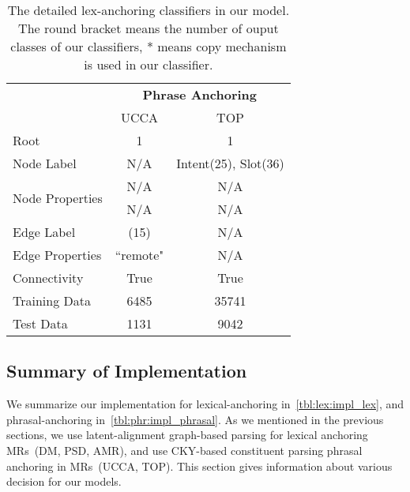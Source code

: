 \begin{table}[!ht]
\begin{center}
\small
\begin{tabular}{l|cc}
\toprule
\hline
                                 & \multicolumn{2}{c}{{\bf Phrase Anchoring}} \\ \cline{2-3}
                                 & UCCA      & TOP                            \\ \hline
Root                             & 1         & 1                              \\ \hline
Node Label                       & N/A       & Intent(25), Slot(36)           \\ \hline
\multirow{2}{*}{Node Properties} & N/A       & N/A                            \\
                                 & N/A       & N/A                            \\ \hline
Edge Label                       & (15)      & N/A                            \\ \hline
Edge Properties                  & ``remote" & N/A                            \\ \hline
Connectivity                     & True      & True                           \\ \hline
Training Data                    & 6485      & 35741                          \\ \hline
Test Data                        & 1131      & 9042                           \\ \hline \bottomrule
\end{tabular}
\end{center}
\caption{The detailed lex-anchoring classifiers in our model. The round bracket means the number of ouput classes of our classifiers, * means copy mechanism is
  used in our classifier.}
\label{tbl:phr:impl_phrasal}
\end{table}

\subsection{Summary of Implementation}
\label{ssec:impl_summary}

We summarize our implementation for lexical-anchoring
in~\autoref{tbl:lex:impl_lex}, and phrasal-anchoring
in~\autoref{tbl:phr:impl_phrasal}. As we mentioned in the previous
sections, we use latent-alignment graph-based parsing for lexical
anchoring MRs~(DM, PSD, AMR), and use CKY-based constituent parsing
phrasal anchoring in MRs~(UCCA, TOP). This section gives information
about various decision for our models.

